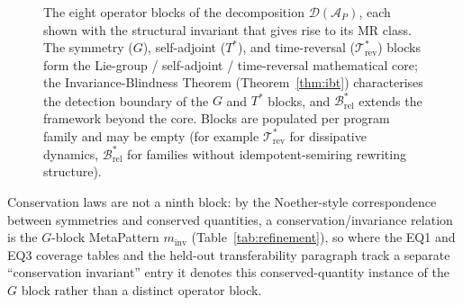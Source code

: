 \documentclass[manuscript]{acmart}
\begin{document}
\begin{figure}[h]
\centering
{}
\caption{The eight operator blocks of the decomposition $\mathcal{D}(\mathcal{A}_P)$,
each shown with the structural invariant that gives rise to its MR class. The
symmetry ($G$), self-adjoint ($T^{*}$), and time-reversal
($\mathcal{T}^{*}_{\mathrm{rev}}$) blocks form the Lie-group / self-adjoint /
time-reversal mathematical core; the Invariance-Blindness Theorem
(Theorem~\ref{thm:ibt}) characterises the detection boundary of the $G$ and
$T^{*}$ blocks, and $\mathcal{B}^{*}_{\mathrm{rel}}$ extends the framework beyond
the core. Blocks are populated per program family and may be empty (for example
$\mathcal{T}^{*}_{\mathrm{rev}}$ for dissipative dynamics, $\mathcal{B}^{*}_{\mathrm{rel}}$
for families without idempotent-semiring rewriting structure).}
\label{fig:blocks}
\end{figure}

Conservation laws are not a ninth block: by the Noether-style correspondence between symmetries and conserved quantities, a conservation/invariance relation is the $G$-block MetaPattern $m_{\mathrm{inv}}$ (Table~\ref{tab:refinement}), so where the EQ1 and EQ3 coverage tables and the held-out transferability paragraph track a separate ``conservation invariant'' entry it denotes this conserved-quantity instance of the $G$ block rather than a distinct operator block.
\end{document}
